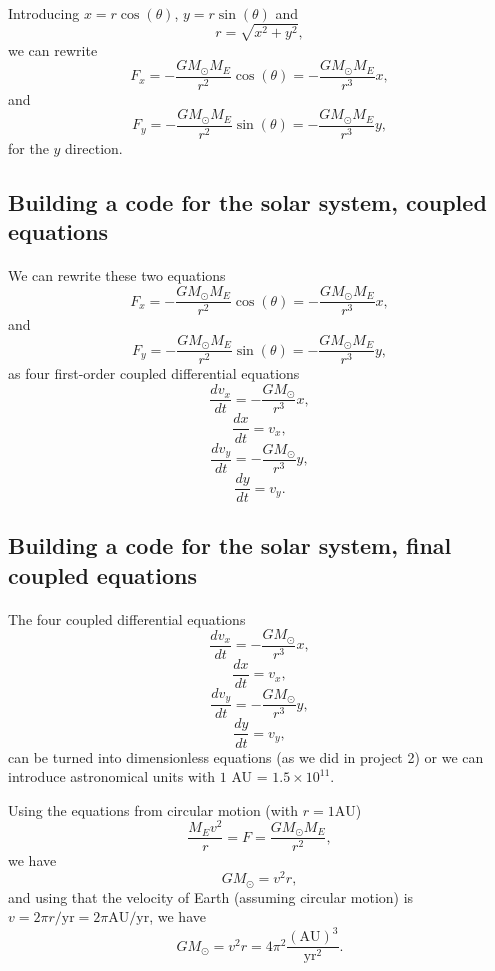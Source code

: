 \documentclass[%
oneside,                 %
final,                   %
10pt]{article}
\begin{document}
\paragraph{}
Introducing $x=r\cos{(\theta)}$, $y=r\sin{(\theta)}$ and
\[
r = \sqrt{x^2+y^2},
\]
we can rewrite 
  \[
   F_{x}=-\frac{GM_{\odot}M_E}{r^2}\cos{(\theta)}=-\frac{GM_{\odot}M_E}{r^3}x,
  \]
and
  \[
     F_{y}=-\frac{GM_{\odot}M_E}{r^2}\sin{(\theta)}=-\frac{GM_{\odot}M_E}{r^3}y,
  \]
for the $y$ direction.




\subsection*{Building a code for the solar system, coupled equations}

\paragraph{}
We can rewrite these two equations
  \[
   F_{x}=-\frac{GM_{\odot}M_E}{r^2}\cos{(\theta)}=-\frac{GM_{\odot}M_E}{r^3}x,
  \]
and
  \[
     F_{y}=-\frac{GM_{\odot}M_E}{r^2}\sin{(\theta)}=-\frac{GM_{\odot}M_E}{r^3}y,
  \]
as four first-order coupled differential equations
\[
   \frac{dv_x}{dt}=-\frac{GM_{\odot}}{r^3}x,
\]
\[
   \frac{dx}{dt}=v_x,
\]
\[
   \frac{dv_y}{dt}=-\frac{GM_{\odot}}{r^3}y,
\]
\[
   \frac{dy}{dt}=v_y.
\]




\subsection*{Building a code for the solar system, final coupled equations}

\paragraph{}
The four coupled differential equations
\[
   \frac{dv_x}{dt}=-\frac{GM_{\odot}}{r^3}x,
\]
\[
   \frac{dx}{dt}=v_x,
\]
\[
   \frac{dv_y}{dt}=-\frac{GM_{\odot}}{r^3}y,
\]
\[
   \frac{dy}{dt}=v_y,
\]
can be turned into dimensionless equations (as we did in project 2) or we can introduce astronomical units with $1$ AU = $1.5\times 10^{11}$. 

Using the equations from circular motion (with $r =1\mathrm{AU}$) 
\[
\frac{M_E v^2}{r} = F = \frac{GM_{\odot}M_E}{r^2},
\]
we have
\[
GM_{\odot}=v^2r,
\]
and using that the velocity of Earth (assuming circular motion) is
$v = 2\pi r/\mathrm{yr}=2\pi\mathrm{AU}/\mathrm{yr}$, we have
\[
GM_{\odot}= v^2r = 4\pi^2 \frac{(\mathrm{AU})^3}{\mathrm{yr}^2}.
\]
\end{document}

